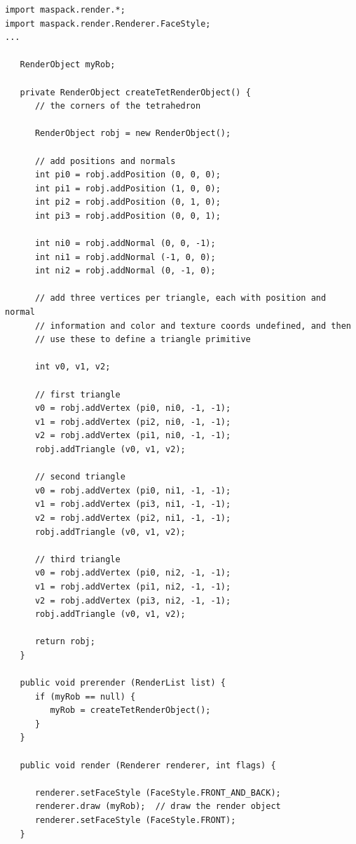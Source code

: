 \begin{lstlisting}[caption={Construction and use of a render object to draw
a partial tetrahedron.}, 
label=renderObjTet:lst]
import maspack.render.*;
import maspack.render.Renderer.FaceStyle;
...

   RenderObject myRob;
   
   private RenderObject createTetRenderObject() {
      // the corners of the tetrahedron
      
      RenderObject robj = new RenderObject();
   
      // add positions and normals
      int pi0 = robj.addPosition (0, 0, 0);
      int pi1 = robj.addPosition (1, 0, 0);
      int pi2 = robj.addPosition (0, 1, 0);
      int pi3 = robj.addPosition (0, 0, 1);
   
      int ni0 = robj.addNormal (0, 0, -1);
      int ni1 = robj.addNormal (-1, 0, 0);
      int ni2 = robj.addNormal (0, -1, 0);
   
      // add three vertices per triangle, each with position and normal
      // information and color and texture coords undefined, and then
      // use these to define a triangle primitive
   
      int v0, v1, v2;
   
      // first triangle
      v0 = robj.addVertex (pi0, ni0, -1, -1);
      v1 = robj.addVertex (pi2, ni0, -1, -1);
      v2 = robj.addVertex (pi1, ni0, -1, -1);
      robj.addTriangle (v0, v1, v2);
   
      // second triangle
      v0 = robj.addVertex (pi0, ni1, -1, -1);
      v1 = robj.addVertex (pi3, ni1, -1, -1);
      v2 = robj.addVertex (pi2, ni1, -1, -1);
      robj.addTriangle (v0, v1, v2);
   
      // third triangle
      v0 = robj.addVertex (pi0, ni2, -1, -1);
      v1 = robj.addVertex (pi1, ni2, -1, -1);
      v2 = robj.addVertex (pi3, ni2, -1, -1);
      robj.addTriangle (v0, v1, v2);
   
      return robj;
   }
   
   public void prerender (RenderList list) {
      if (myRob == null) {
         myRob = createTetRenderObject();
      }
   }
         
   public void render (Renderer renderer, int flags) {
   
      renderer.setFaceStyle (FaceStyle.FRONT_AND_BACK); 
      renderer.draw (myRob);  // draw the render object
      renderer.setFaceStyle (FaceStyle.FRONT); 
   }
\end{lstlisting}

